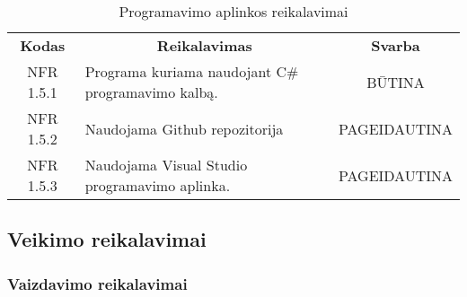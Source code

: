 \documentclass{VUMIFPSkursinis}
\begin{document}
\begin{center}
	\begin{table}[H]
	\begin{tabular}{|p{2cm}|p{}|p{}|}
	\hline
	    \rowcolor{lightgray}
		\multicolumn{3}{|c|}{Programavimo aplinkos reikalavimai}\\
		
	\hline
		\multicolumn{1}{|c|}{{\bfseries Kodas}}&
		\multicolumn{1}{|c|}{{\bfseries Reikalavimas}}&
		\multicolumn{1}{|c|}{{\bfseries Svarba}}\\
	\hline 	
		\multicolumn{1}{|c|}{NFR 1.5.1}&
		{Programa kuriama naudojant C\# programavimo kalbą.}&
		\multicolumn{1}{|c|}{BŪTINA}\\	
	
	\hline 	
		\multicolumn{1}{|c|}{NFR 1.5.2}&
		{Naudojama Github repozitorija }&
		\multicolumn{1}{|p{1.5cm}|}{PAGEIDAUTINA}\\		
	
	\hline 	
		\multicolumn{1}{|c|}{NFR 1.5.3}&
		{Naudojama Visual Studio programavimo aplinka.}&
		\multicolumn{1}{|p{1.5cm}|}{PAGEIDAUTINA}\\		
	
	\hline 	 	 	
	\end{tabular}
	\caption{Programavimo aplinkos reikalavimai}
	\label{table:Programavimoaplinkosreikalavimai}
	\end{table}

\end{center}

\subsection{Veikimo reikalavimai}

\subsubsection{Vaizdavimo reikalavimai}
\end{document}
